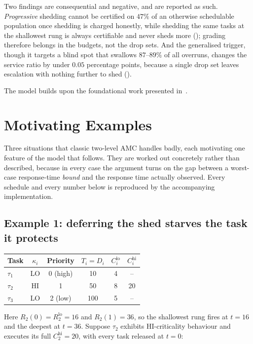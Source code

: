 \documentclass{article}
\begin{document}
Two findings are consequential and negative, and are reported as such.
\emph{Progressive} shedding cannot be certified on $47\%$ of an otherwise
schedulable population once shedding is charged honestly, while shedding the
same tasks at the shallowest rung is always certifiable and never sheds more
(); grading therefore belongs in the budgets, not the
drop sets. And the generalised trigger, though it targets a blind spot that
swallows $87$--$89\%$ of all overruns, changes the service ratio by under
$0.05$ percentage points, because a single drop set leaves escalation with
nothing further to shed ().

The model builds upon the foundational work presented in~\cite{9804600}.

\section{Motivating Examples}
\label{sec:motivating}

Three situations that classic two-level AMC handles badly, each motivating one
feature of the model that follows. They are worked out concretely rather than
described, because in every case the argument turns on the gap between a
worst-case response-time \emph{bound} and the response time actually observed.
Every schedule and every number below is reproduced by the accompanying
implementation.

\subsection{Example 1: deferring the shed starves the task it protects}
\label{sec:ex-defer}

\begin{center}
\begin{tabular}{lccccc}
\toprule
Task & $\kappa_i$ & Priority & $T_i = D_i$ & $C_i^{\mathrm{lo}}$ & $C_i^{\mathrm{hi}}$ \\
\midrule
$\tau_1$ & LO & 0 (high) & 10  & 4 & -- \\
$\tau_2$ & HI & 1        & 50  & 8 & 20 \\
$\tau_3$ & LO & 2 (low)  & 100 & 5 & -- \\
\bottomrule
\end{tabular}
\end{center}

\noindent Here $R_2(0) = R_2^{\mathrm{lo}} = 16$ and $R_2(1) = 36$, so the
shallowest rung fires at $t = 16$ and the deepest at $t = 36$. Suppose
$\tau_2$ exhibits HI-criticality behaviour and executes its full
$C_2^{\mathrm{hi}} = 20$, with every task released at $t = 0$:
\end{document}
